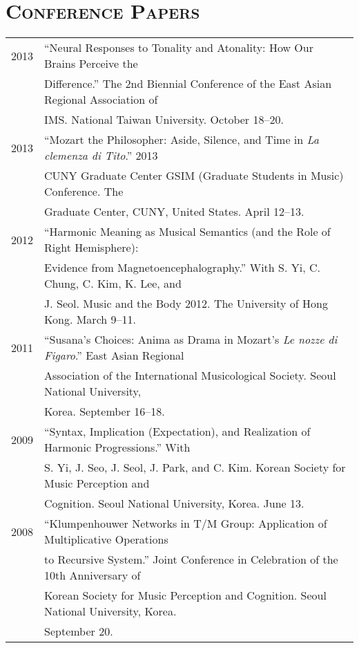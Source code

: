 \documentclass[a4,11pt,draft]{article}
\begin{document}
  \vspace{2.5mm}
  
  \section*{\textsc{Conference Papers}}
  
  \hspace*{-0.25cm}
  \begin{tabular}{p{2.5cm} p{12.5cm}}
  2013 & “Neural Responses to Tonality and Atonality: How Our Brains Perceive the\\
  & Difference.” The 2nd Biennial Conference of the East Asian Regional Association of\\
  & IMS. National Taiwan University. October 18–20.\\[2mm]

  2013 & “Mozart the Philosopher: Aside, Silence, and Time in \textit{La clemenza di Tito}.” 2013\\
  & CUNY Graduate Center GSIM (Graduate Students in Music) Conference. The\\
  & Graduate Center, CUNY, United States. April 12–13.\\[2mm]

  2012 & “Harmonic Meaning as Musical Semantics (and the Role of Right Hemisphere):\\
  & Evidence from Magnetoencephalography.” With S. Yi, C. Chung, C. Kim, K. Lee, and\\
  & J. Seol. Music and the Body 2012. The University of Hong Kong. March 9–11.\\[2mm]

  2011 & “Susana’s Choices: Anima as Drama in Mozart’s \textit{Le nozze di Figaro}.” East Asian Regional\\
  & Association of the International Musicological Society. Seoul National University,\\
  & Korea. September 16–18.\\[2mm]

  2009 & “Syntax, Implication (Expectation), and Realization of Harmonic Progressions.” With\\
  & S. Yi, J. Seo, J. Seol, J. Park, and C. Kim. Korean Society for Music Perception and\\
  & Cognition. Seoul National University, Korea. June 13.\\[2mm]

  2008 & “Klumpenhouwer Networks in T/M Group: Application of Multiplicative Operations\\
  & to Recursive System.” Joint Conference in Celebration of the 10th Anniversary of\\
  & Korean Society for Music Perception and Cognition. Seoul National University, Korea.\\
  & September 20.
  \end{tabular}
  
\end{document}
